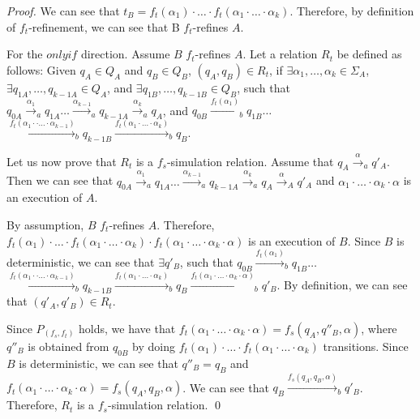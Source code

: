 \begin {proof}
We can see that $t_B = f_t(\alpha_1) \cdot \ldots \cdot f_t(\alpha_1 \cdot \ldots \cdot \alpha_k)$. Therefore, by definition of $f_t$-refinement, we can see that B $f_t$-refines $A$.


For the $\mathit{only if}$ direction. Assume $B$ $f_t$-refines $A$. Let a relation $R_t$ be defined as follows: Given $q_A \in Q_A$ and $q_B \in Q_B$, $(q_A,q_B) \in R_t$, if $\exists \alpha_1, \ldots, \alpha_k \in \Sigma_A$, $\exists q_{1A},\ldots,q_{k-1A} \in Q_A$, and $\exists q_{1B},\ldots,q_{k-1B} \in Q_B$, such that $q_{0A} {\xrightarrow{\alpha_1}}_a q_{1A} \ldots {\xrightarrow{\alpha_{k-1}}}_a q_{k-1A} {\xrightarrow{\alpha_k}}_a q_A$, and $q_{0B} {\xrightarrow{f_t(\alpha_1)}}_b q_{1B} \ldots$ ${\xrightarrow{f_t(\alpha_1 \cdot \cdot \ldots \cdot \alpha_{k-1})}}_b q_{k-1B} {\xrightarrow{f_t(\alpha_1 \cdot \ldots \cdot \alpha_k)}}_b q_B$.

Let us now prove that $R_t$ is a $f_s$-simulation relation. Assume that $q_A {\xrightarrow{\alpha}}_a q'_A$. Then we can see that $q_{0A} {\xrightarrow{\alpha_1}}_a q_{1A} \ldots {\xrightarrow{\alpha_{k-1}}}_a q_{k-1A} {\xrightarrow{\alpha_k}}_a q_A {\xrightarrow{\alpha}}_A q'_A$ and $\alpha_1 \cdot \ldots \cdot \alpha_k \cdot \alpha$ is an execution of $A$.

By assumption, $B$ $f_t$-refines $A$. Therefore, $f_t(\alpha_1) \cdot \ldots \cdot f_t(\alpha_1 \cdot \ldots \cdot \alpha_k) \cdot f_t(\alpha_1 \cdot \ldots \cdot \alpha_k \cdot \alpha)$ is an execution of $B$. Since $B$ is deterministic, we can see that $\exists q'_B$, such that $q_{0B} {\xrightarrow{f_t(\alpha_1)}}_b q_{1B} \ldots$ ${\xrightarrow{f_t(\alpha_1 \cdot \cdot \ldots \cdot \alpha_{k-1})}}_b q_{k-1B} {\xrightarrow{f_t(\alpha_1 \cdot \ldots \cdot \alpha_k)}}_b q_B {\xrightarrow{f_t(\alpha_1 \cdot \ldots \cdot \alpha_k \cdot \alpha)}}_b q'_B$. By definition, we can see that $(q'_A,q'_B) \in R_t$.

Since $P_{(f_s,f_t)}$ holds, we have that $f_t(\alpha_1 \cdot \ldots \cdot \alpha_k \cdot \alpha) = f_s(q_A,q''_B,\alpha)$, where $q''_B$ is obtained from $q_{0B}$ by doing $f_t(\alpha_1) \cdot \ldots \cdot f_t(\alpha_1 \cdot \ldots \cdot \alpha_k)$ transitions. Since $B$ is deterministic, we can see that $q''_B = q_B$ and $f_t(\alpha_1 \cdot \ldots \cdot \alpha_k \cdot \alpha) = f_s(q_A,q_B,\alpha)$. We can see that $q_B {\xrightarrow{f_s(q_A,q_B,\alpha)}}_b q'_B$. Therefore, $R_t$ is a $f_s$-simulation relation. \qed
\end {proof}

